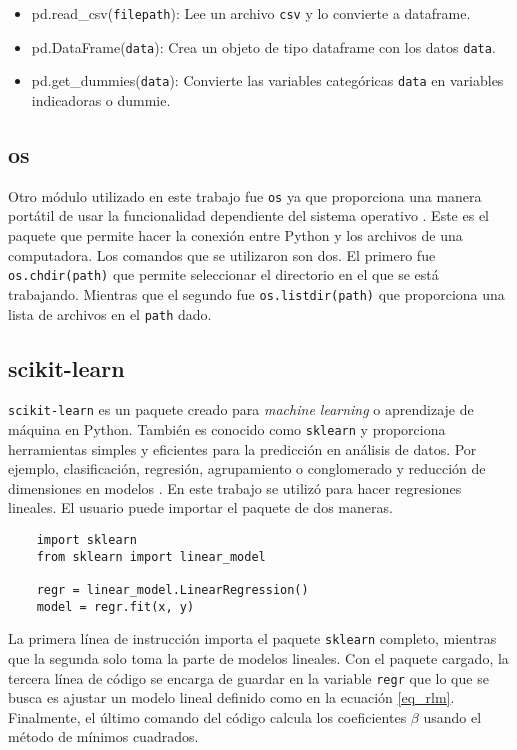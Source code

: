 \begin{itemize}
	\item pd.read\_csv(\texttt{filepath}): Lee un archivo \texttt{csv} y lo convierte a dataframe.
	
	\item pd.DataFrame(\texttt{data}): Crea un objeto de tipo dataframe con los datos \texttt{data}. 
	
	\item pd.get\_dummies(\texttt{data}): Convierte las variables categóricas \texttt{data} en variables indicadoras o dummie. 
\end{itemize}

\subsection{os}
Otro módulo utilizado en este trabajo fue \texttt{os} \citep{software_python} ya que proporciona una manera portátil de usar la funcionalidad dependiente del sistema operativo \citep{doc_python}. Este es el paquete que permite hacer la conexión entre \textsf{Python} y los archivos de una computadora. Los comandos que se utilizaron son dos. El primero fue \texttt{os.chdir(path)} que permite seleccionar el directorio en el que se está trabajando. Mientras que el segundo fue \texttt{os.listdir(path)} que proporciona una lista de archivos en el \texttt{path} dado. 


\subsection{scikit-learn} \label{sec_sklearn}
\texttt{scikit-learn} \citep{software_scikitlearn} es un paquete creado para \textit{machine learning} o aprendizaje de máquina en \textsf{Python}. También es conocido como \texttt{sklearn} y proporciona herramientas simples y eficientes para la predicción en análisis de datos. Por ejemplo, clasificación, regresión, agrupamiento o conglomerado y reducción de dimensiones en modelos \citep{doc_python}. En este trabajo se utilizó para hacer regresiones lineales. El usuario puede importar el paquete de dos maneras. 

\begin{verbatim}
	import sklearn
	from sklearn import linear_model
	
	regr = linear_model.LinearRegression()
	model = regr.fit(x, y)
\end{verbatim}

La primera línea de instrucción importa el paquete \texttt{sklearn} completo, mientras que la segunda solo toma la parte de modelos lineales. Con el paquete cargado, la tercera línea de código se encarga de guardar en la variable \texttt{regr} que lo que se busca es ajustar un modelo lineal definido como en la ecuación \ref{eq_rlm}. Finalmente, el último comando del código calcula los coeficientes $\beta$  usando el método de mínimos cuadrados. 

